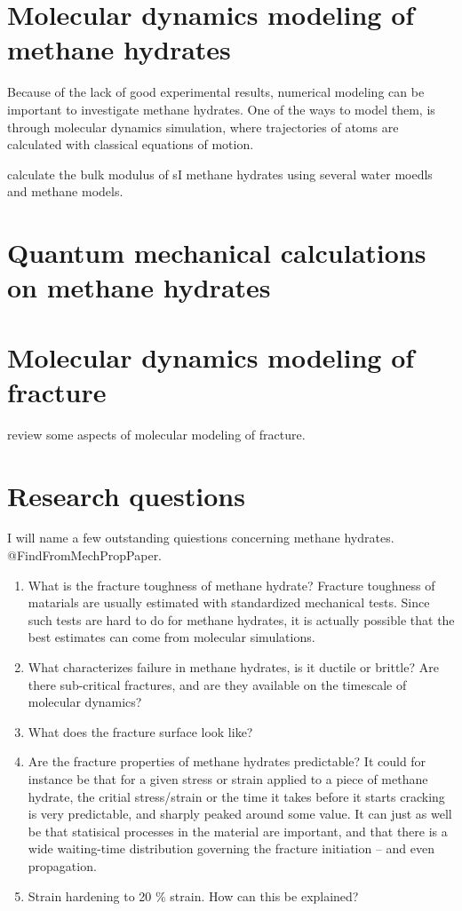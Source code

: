 \section{Molecular dynamics modeling of methane hydrates}
Because of the lack of good experimental results, numerical modeling can be important to investigate methane hydrates. One of the ways to model them, is through molecular dynamics simulation, where trajectories of atoms are calculated with classical equations of motion.

\citet{Ning2010} calculate the bulk modulus of sI methane hydrates using several water moedls and methane models.

\section{Quantum mechanical calculations on methane hydrates}

\section{Molecular dynamics modeling of fracture}
\citet{doi:10.1142/9789812773326_0001} review some aspects of molecular modeling of fracture. 


\section{Research questions}
I will name a few outstanding quiestions concerning methane hydrates. @FindFromMechPropPaper.

\begin{enumerate}
\item What is the fracture toughness of methane hydrate? Fracture toughness of matarials are usually estimated with standardized mechanical tests. Since such tests are hard to do for methane hydrates, it is actually possible that the best estimates can come from molecular simulations. 
\item What characterizes failure in methane hydrates, is it ductile or brittle? Are there sub-critical fractures, and are they available on the timescale of molecular dynamics?
\item What does the fracture surface look like?
\item Are the fracture properties of methane hydrates predictable? It could for instance be that for a given stress or strain applied to a piece of methane hydrate, the critial stress/strain or the time it takes before it starts cracking is very predictable, and sharply peaked around some value. It can just as well be that statisical processes in the material are important, and that there is a wide waiting-time distribution governing the fracture initiation -- and even propagation.
\item Strain hardening to 20 \% strain. How can this be explained?
\end{enumerate}


